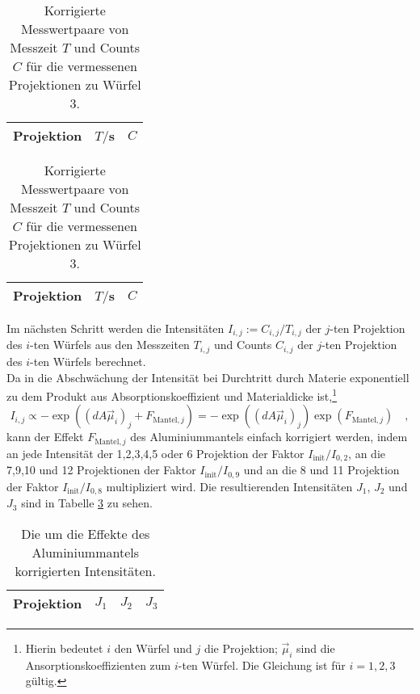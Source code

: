 \begin{table}
\centering
\begin{tabular}{ccc}
\toprule
\midrule
Projektion &$T/$s & $C$ \\
\midrule

\midrule
\bottomrule
\end{tabular}
\caption{Korrigierte Messwertpaare von Messzeit $T$ und Counts $C$ für die vermessenen
Projektionen zu
Würfel 2.} \label{tab:2}

\begin{tabular}{ccc}
\toprule
\midrule
Projektion &$T/$s & $C$ \\
\midrule

\midrule
\bottomrule
\end{tabular}
\caption{Korrigierte Messwertpaare von Messzeit $T$ und Counts $C$ für die vermessenen
Projektionen zu
Würfel 3.} \label{tab:3}
\end{table}
\clearpage
Im nächsten Schritt werden die Intensitäten $I_{i,j}:=C_{i,j}/T_{i,j}$ der $j$-ten Projektion des
$i$-ten
Würfels aus den Messzeiten $T_{i,j}$ und Counts $C_{i,j}$ der $j$-ten Projektion des
$i$-ten Würfels berechnet.\\
Da in die Abschwächung der Intensität bei Durchtritt durch Materie exponentiell zu dem Produkt
aus Absorptionskoeffizient und Materialdicke ist,\footnote{Hierin bedeutet $i$ den Würfel und
$j$ die Projektion; $\vec{\mu}_i$ sind die Ansorptionskoeffizienten zum $i$-ten Würfel. Die
Gleichung ist für $i=1,2,3$ gültig.}
\begin{equation}
I_{i,j} \propto -\exp\left( (d A \vec{\mu}_i)_{j} + F_{\text{Mantel},j} \right)=
-\exp\left( (d A \vec{\mu}_i)_j \right) \exp\left( F_{\text{Mantel},j} \right) \quad ,
\end{equation}
kann der Effekt $F_{\text{Mantel},j}$ des Aluminiummantels einfach
korrigiert werden, indem an jede Intensität der 1,2,3,4,5 oder 6 Projektion der Faktor
$I_\text{init}/I_{0,2}$, an die 7,9,10 und 12 Projektionen der Faktor $I_\text{init}/I_{0,9}$ und
an die 8 und 11 Projektion der Faktor $I_\text{init}/I_{0,8}$ multipliziert wird. Die
resultierenden Intensitäten $J_1$, $J_2$ und $J_3$ sind in Tabelle \ref{tab:korr} zu sehen.
\begin{table}[h]
\centering
\begin{tabular}{cccc}
\toprule
\midrule
Projektion &	$J_1$ & $J_2$ & $J_3$ \\
\midrule

\midrule
\bottomrule
\end{tabular}
\caption{Die um die Effekte des Aluminiummantels korrigierten Intensitäten.} \label{tab:korr}
\end{table}
\clearpage

